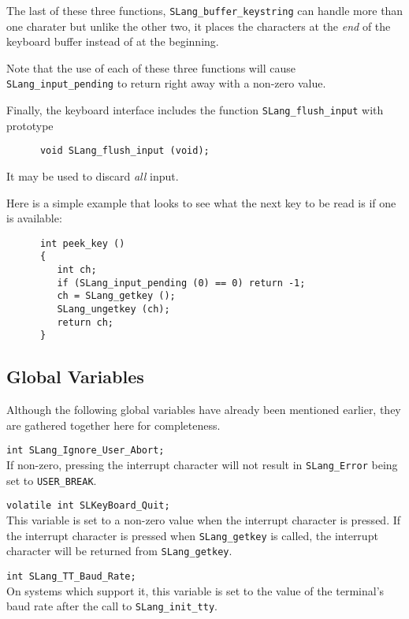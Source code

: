   The last of these three functions, \verb|SLang_buffer_keystring| can
  handle more than one charater but unlike the other two, it places the
  characters at the {\em end} of the keyboard buffer instead of at the
  beginning.

  Note that the use of each of these three functions will cause
  \verb|SLang_input_pending| to return right away with a non-zero value.

  Finally, the \slang{} keyboard interface includes the function
  \verb|SLang_flush_input| with prototype
\begin{verbatim}
      void SLang_flush_input (void);
\end{verbatim} 
  It may be used to discard {\em all} input.
  
  Here is a simple example that looks to see what the next key to be read is
  if one is available:
\begin{verbatim} 
      int peek_key ()
      {
         int ch;
         if (SLang_input_pending (0) == 0) return -1;
         ch = SLang_getkey ();
         SLang_ungetkey (ch);
         return ch;
      }
\end{verbatim}       



\subsection{Global Variables} %
  Although the following \slang{} global variables have already been
  mentioned earlier, they are gathered together here for completeness.
  
  \verb|int SLang_Ignore_User_Abort;|\\
  If non-zero, pressing the interrupt character will not result in
  \verb|SLang_Error| being set to \verb|USER_BREAK|.

  \verb|volatile int SLKeyBoard_Quit;|\\
  This variable is set to a non-zero value when the interrupt
  character is pressed. If the interrupt character is pressed when
  \verb|SLang_getkey| is called, the interrupt character will be
  returned from \verb|SLang_getkey|.

  \verb|int SLang_TT_Baud_Rate;|\\ 
  On systems which support it, this variable is set to the value of the
  terminal's baud rate after the call to \verb|SLang_init_tty|.




